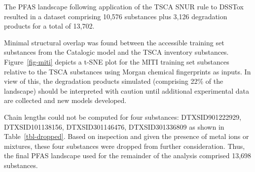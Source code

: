\documentclass[
  super,
  preprint,
  3p]{elsarticle}
\begin{document}
The PFAS landscape following application of the TSCA SNUR rule to DSSTox
resulted in a dataset comprising 10,576 substances plus 3,126
degradation products for a total of 13,702.

Minimal structural overlap was found between the accessible training set
substances from the Catalogic model and the TSCA inventory substances.
Figure~\ref{fig-miti} depicts a t-SNE plot for the MITI training set
substances relative to the TSCA substances using Morgan chemical
fingerprints as inputs. In view of this, the degradation products
simulated (comprising 22\% of the landscape) should be interpreted with
caution until additional experimental data are collected and new models
developed.

Chain lengths could not be computed for four substances:
DTXSID901222929, DTXSID101138156, DTXSID301146476, DTXSID301336809 as
shown in Table~\ref{tbl-dropped}. Based on inspection and given the
presence of metal ions or mixtures, these four substances were dropped
from further consideration. Thus, the final PFAS landscape used for the
remainder of the analysis comprised 13,698 substances.
\end{document}
